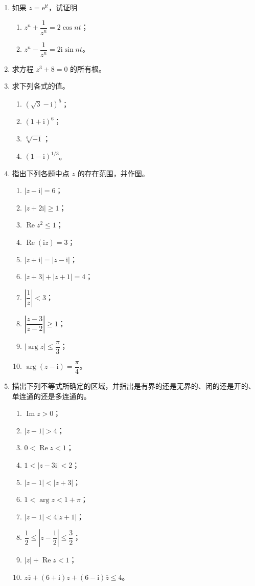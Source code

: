 \documentclass[UTF8,11pt,a4paper]{ctexart}
\newcommand{\ee}{\mathrm{e}}
\newcommand{\ii}{\mathrm{i}}
\newcommand{\Ree}{\operatorname{Re}}
\newcommand{\Imm}{\operatorname{Im}}
\begin{document}
\begin{enumerate}
\item 如果 $z=\ee^{\ii t}$，试证明
  \begin{enumerate}
  \item $z^n+\dfrac1{z^n}=2\cos nt$；
  \item $z^n-\dfrac1{z^n}=2\ii\sin nt$。
  \end{enumerate}

\item 求方程 $z^3+8=0$ 的所有根。

\item 求下列各式的值。
  \begin{enumerate}
  \item $(\sqrt3-\ii)^5$；
  \item $(1+\ii)^6$；
  \item $\sqrt[6]{-1}$；
  \item $(1-\ii)^{1/3}$。
  \end{enumerate}

\item 指出下列各题中点 $z$ 的存在范围，并作图。
  \begin{enumerate}
  \item $|z-\ii|=6$；
  \item $|z+2\ii|\geqslant1$；
  \item $\Ree z^2\leqslant1$；
  \item $\Ree(\ii z)=3$；
  \item $|z+\ii|=|z-\ii|$；
  \item $|z+3|+|z+1|=4$；
  \item $\left|\dfrac1z\right|<3$；
  \item $\left|\dfrac{z-3}{z-2}\right|\geqslant1$；
  \item $|\arg z|\leqslant\dfrac\pi3$；
  \item $\arg(z-\ii)=\dfrac\pi4$。
  \end{enumerate}

\item 描出下列不等式所确定的区域，并指出是有界的还是无界的、闭的还是开的、单连通的还是多连通的。
  \begin{enumerate}
  \item $\Imm z>0$；
  \item $|z-1|>4$；
  \item $0<\Ree z<1$；
  \item $1<|z-3\ii|<2$；
  \item $|z-1|<|z+3|$；
  \item $1<\arg z<1+\pi$；
  \item $|z-1|<4|z+1|$；
  \item $\dfrac12\leqslant\left|z-\dfrac12\right|\leqslant\dfrac32$；
  \item $|z|+\Ree z<1$；
  \item $z\overline z+(6+\ii)z+(6-\ii)\overline z\leqslant4$。
  \end{enumerate}


\end{enumerate}
\end{document}
